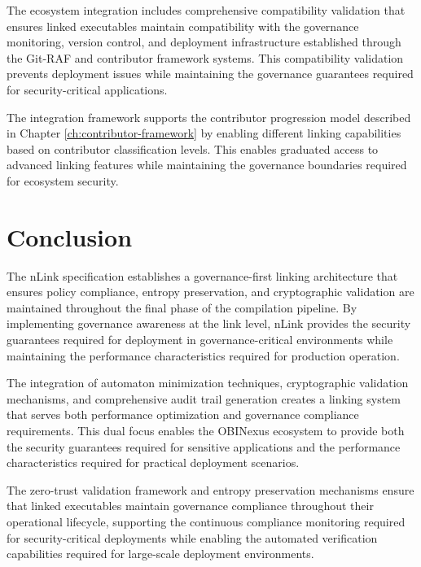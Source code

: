 The ecosystem integration includes comprehensive compatibility validation that ensures linked executables maintain compatibility with the governance monitoring, version control, and deployment infrastructure established through the Git-RAF and contributor framework systems. This compatibility validation prevents deployment issues while maintaining the governance guarantees required for security-critical applications.

The integration framework supports the contributor progression model described in Chapter \ref{ch:contributor-framework} by enabling different linking capabilities based on contributor classification levels. This enables graduated access to advanced linking features while maintaining the governance boundaries required for ecosystem security.

\section*{Conclusion}

The nLink specification establishes a governance-first linking architecture that ensures policy compliance, entropy preservation, and cryptographic validation are maintained throughout the final phase of the compilation pipeline. By implementing governance awareness at the link level, nLink provides the security guarantees required for deployment in governance-critical environments while maintaining the performance characteristics required for production operation.

The integration of automaton minimization techniques, cryptographic validation mechanisms, and comprehensive audit trail generation creates a linking system that serves both performance optimization and governance compliance requirements. This dual focus enables the OBINexus ecosystem to provide both the security guarantees required for sensitive applications and the performance characteristics required for practical deployment scenarios.

The zero-trust validation framework and entropy preservation mechanisms ensure that linked executables maintain governance compliance throughout their operational lifecycle, supporting the continuous compliance monitoring required for security-critical deployments while enabling the automated verification capabilities required for large-scale deployment environments.